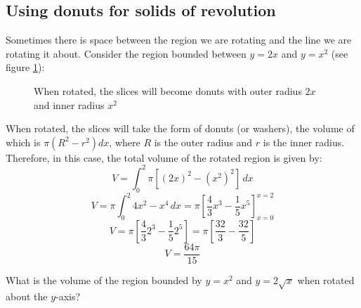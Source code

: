 \subsection{Using donuts for solids of revolution}
Sometimes there is space between the region we are rotating and the line we are
rotating it about. Consider the region bounded between $y = 2x$ and $y = x^2$  
(see figure \ref{fig:donut}):

\begin{figure}[htbp]
    \centering
    \caption{When rotated, the slices will become donuts with outer radius $2x$
    and inner radius $x^2$}
    \label{fig:donut}
\end{figure}

When rotated, the slices will take the form of donuts (or washers), the volume 
of which is $\pi \left( R^2 - r^2 \right) dx$, where $R$ is the outer radius 
and $r$ is the inner radius. Therefore, in this case, the total volume of the 
rotated region is given by:
$$V = \int_0^2 \pi \left[ \left( 2x \right)^2 - \left(x^2 \right)^2 \right]\,
dx$$
$$V = \pi \int_0^2 4x^2 - x^4\,dx = \pi \left[\frac{4}{3}x^3 - \frac{1}{5}x^5 
\right]_{x = 0}^{x = 2}$$
$$V = \pi \left[\frac{4}{3}2^3 - \frac{1}{5}2^5 \right] = \pi \left[ \frac{32}{
3} - \frac{32}{5} \right] $$
$$V = \frac{64 \pi}{15} $$

\begin{Exercise}[label = volume2]
What is the volume of the region bounded by $y = x^2$ and $y = 2\sqrt{x}$ when 
rotated about the $y$-axis? 
\end{Exercise}

